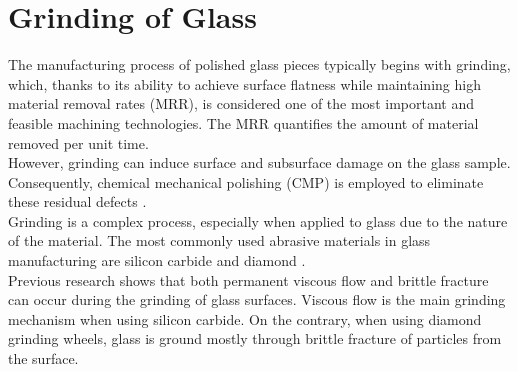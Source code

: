 \label{ch:glass_manufacturing}

\section{Grinding of Glass}
\label{sec:grinding_glass}

The manufacturing process of polished glass pieces typically begins with grinding, which, thanks to its ability to achieve surface flatness while maintaining high material removal rates (MRR), is considered one of the most important and feasible machining technologies. The MRR quantifies the amount of material removed per unit time.
\\
However, grinding can induce surface and subsurface damage on the glass sample. Consequently, chemical mechanical polishing (CMP) is employed to eliminate these residual defects \cite{leiChemicalMechanicalPolishing2010}.
\\
Grinding is a complex process, especially when applied to glass due to the nature of the material. The most commonly used abrasive materials in glass manufacturing are silicon carbide and diamond \cite{huertaGrindingGlassMechanics1976}. 
\\
Previous research shows that both permanent viscous flow \cite{bridgmanEffectsVeryHigh1953,marshPlasticFlowGlass1997} and brittle fracture \cite{hollandPropertiesGlassSurfaces1966,pahlitzschRecentResultsResearch1966} can occur during the grinding of glass surfaces. Viscous flow is the main grinding mechanism when using silicon carbide. On the contrary, when using diamond grinding wheels, glass is ground mostly through brittle fracture of particles from the surface.


